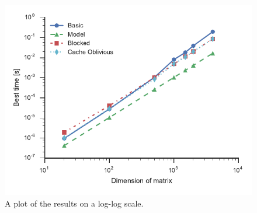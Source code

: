 \documentclass{article}
\begin{document}
\begin{figure}
    \centering
    \includegraphics{res_loglog.pdf}\hspace{0.9cm}
    \caption{A plot of the results on a log-log scale.}
    \label{fig:resloglog}
\end{figure}
\end{document}

